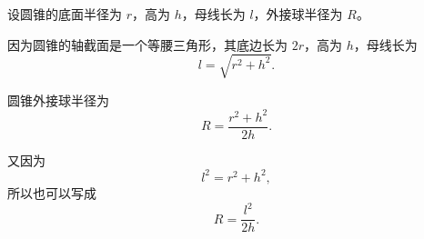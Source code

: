 设圆锥的底面半径为 \(r\)，高为 \(h\)，母线长为 \(l\)，外接球半径为 \(R\)。

因为圆锥的轴截面是一个等腰三角形，其底边长为 \(2r\)，高为 \(h\)，母线长为
\[
	l=\sqrt{r^2+h^2}.
\]

圆锥外接球半径为
\[
	R=\frac{r^2+h^2}{2h}.
\]

又因为
\[
	l^2=r^2+h^2,
\]
所以也可以写成
\[
	R=\frac{l^2}{2h}.
\]